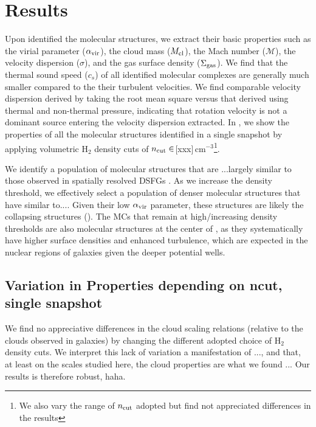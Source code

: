 \documentclass[apj]{emulateapj} %
\begin{document}
\section{Results} \label{sec:results}

Upon identified the molecular structures, we extract their basic properties such as
the virial parameter ($\alpha_{\rm vir}$), 
the cloud mass ($M_{\rm cl}$), 
the Mach number ($\mathcal{M}$), 
the velocity dispersion ($\sigma$), and the 
gas surface density ($\Sigma_{\rm gas}$).
We find that the thermal sound speed ($c_s$) 
of all identified molecular complexes are generally much smaller compared to the their turbulent velocities.
We find comparable velocity dispersion derived by taking the root mean square versus
that derived using thermal and non-thermal pressure, indicating that 
rotation velocity is not a dominant source entering the velocity dispersion extracted.
In \Fig{}, we show the properties of all the molecular structures identified in a single snapshot
by applying volumetric H$_2$ density cuts of $n_{\rm cut}\in$[xxx]\,cm$^{-3}$\footnote{We also vary the range of 
$n_{\rm cut}$ adopted but find not appreciated differences in the results}.

We identify a population of molecular structures that are ...largely similar to those observed 
in \z{} spatially resolved DSFGs \citep{Swinbank11a}. 
As we increase the density threshold, we effectively select a population of 
denser molecular structures that have similar to.... 
Given their low $\alpha_{\rm vir}$ parameter,
these structures are likely the collapsing structures (). 
The MCs that remain at high/increasing density thresholds
are also molecular structures at the center of \flower,
as they systematically have higher surface densities 
and enhanced turbulence, which are expected in the nuclear regions of 
galaxies given the deeper potential wells.


\subsection{Variation in Properties depending on ncut, single snapshot}	 \label{sec:ncut}

We find no appreciative differences in the cloud scaling relations (relative to the clouds 
observed in galaxies) by changing the different adopted choice of H$_2$ density cuts. 
We interpret this lack of variation a manifestation of ..., and that, at least on the scales studied here, the cloud properties are what we found ... 
Our results is therefore robust, haha.
\end{document}
